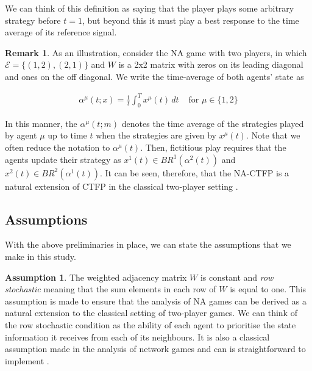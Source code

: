 \documentclass{article}
\theoremstyle{definition}
\newtheorem{assumption}{Assumption}
\newtheorem*{remark}{Remark}
\newcommand{\edgeset}{\mathcal{E}}
\newcommand{\weightset}{W}
\newcommand{\xmu}{x^{\mu}}
\begin{document}
  We can think of this definition as saying that the player plays some arbitrary strategy before
  $t = 1$, but beyond this it must play a best response to the time average of its reference
  signal.
  
  \begin{remark}
    As an illustration, consider the NA game with two players, in which $\edgeset = \{(1, 2),
    (2, 1)\}$ and $\weightset$ is a 2x2 matrix with zeros on its leading diagonal and ones on
    the off diagonal. We write the time-average of both agents' state as
  
    \begin{align}
      \alpha^\mu(t; x) = \frac{1}{t} \int_0^T \xmu(t) \, dt & \text{ for $\mu \in \{1, 2\}$}
    \end{align}

    In this manner, the $\alpha^\mu(t; m)$ denotes the time average of the strategies played by
    agent $\mu$ up to time $t$ when the strategies are given by $\xmu(t)$. Note that we often reduce the notation to $\alpha^\mu(t)$. Then, fictitious play requires that the agents update their
    strategy as $x^1(t) \in BR^1(\alpha^2(t))$ and $x^2(t) \in BR^2(\alpha^1(t))$. It can be
    seen, therefore, that the NA-CTFP is a natural extension of CTFP in the classical
    two-player setting \cite{}.
  \end{remark}

\subsection{Assumptions}

  With the above preliminaries in place, we can state the assumptions that we make in this study.

  \begin{assumption}\label{ass::rowstochastic}
    The weighted adjacency matrix $\weightset$ is constant and \emph{row stochastic} meaning
    that the sum elements in each row of $\weightset$ is equal to one. This assumption is
    made to ensure that the analysis of NA games can be derived as a natural extension to the
    classical setting of two-player games. We can think of the row stochastic condition as the
    ability of each agent to prioritise the state information it receives from each of its
    neighbours. It is also a classical assumption made in the analysis of network games
    \cite{one of the network game papers} and can is straightforward to implement \cite{Eyad}.
  \end{assumption}
\end{document}
